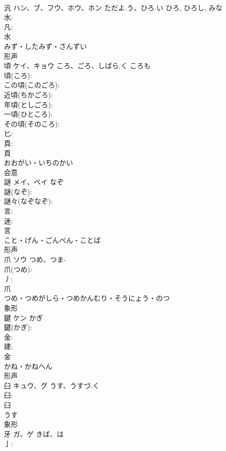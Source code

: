 \documentclass[8pt]{extreport}
\begin{document}
\begin{CJK}{UTF8}{min}
\\	汎	ハン、ブ、フウ、ホウ、ホン	ただよ.う、ひろ.い	ひろ, ひろし, みな	
\\	水: 
\\	凡: 
\\	水	
\\	みず・したみず・さんずい	
\\	形声 
\\	頃	ケイ、キョウ	ころ、ごろ、しばら.く	ころも	
\\	頃(ころ): 
\\	この頃(このごろ): 
\\	近頃(ちかごろ): 
\\	年頃(としごろ): 
\\	一頃(ひところ): 
\\	その頃(そのころ): 
\\	匕: 
\\	頁: 
\\	頁	
\\	おおがい・いちのかい	
\\	会意 
\\	謎	メイ、ベイ	なぞ		
\\	謎(なぞ): 
\\	謎々(なぞなぞ): 
\\	言: 
\\	迷: 
\\	言	
\\	こと・げん・ごんべん・ことば	
\\	形声 
\\	爪	ソウ	つめ、つま-		
\\	爪(つめ): 
\\	丿: 
\\	爪	
\\	つめ・つめがしら・つめかんむり・そうにょう・のつ	
\\	象形 
\\	鍵	ケン	かぎ		
\\	鍵(かぎ): 
\\	金: 
\\	建: 
\\	金	
\\	かね・かねへん	
\\	形声 
\\	臼	キュウ、グ	うす、うすづ.く		
\\	臼: 
\\	臼	
\\	うす	
\\	象形 
\\	牙	ガ、ゲ	きば、は		
\\	亅: 

\end{CJK}
\end{document}
